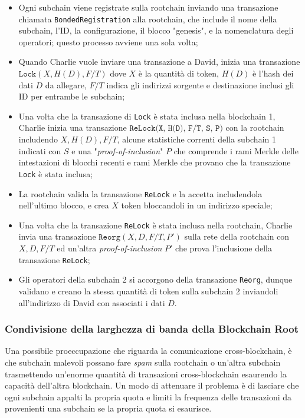 \begin{itemize}
	\item Ogni subchain viene registrate sulla rootchain inviando una transazione chiamata \texttt{BondedRegistration} alla rootchain, che include il nome della subchain, l'ID, la configurazione, il blocco "genesis", e la nomenclatura degli operatori; questo processo avviene una sola volta;

	\item Quando Charlie vuole inviare una transazione a David, inizia una transazione $\texttt{Lock}(X, H(D), F/T)$ dove $X$ è la quantità di token, $H(D)$ è l'hash dei dati $D$ da allegare, $F/T$ indica gli indirizzi sorgente e destinazione inclusi gli ID per entrambe le subchain;

	\item Una volta che la transazione di \texttt{Lock} è stata inclusa nella blockchain 1, Charlie inizia una transazione $\texttt{ReLock(X, H(D), F/T, S, P)}$ con la rootchain includendo $X, H(D), F/T$, alcune statistiche correnti della subchain 1 indicati con $S$ e una "\emph{proof-of-inclusion}" $P$ che comprende i rami Merkle delle intestazioni di blocchi recenti e rami Merkle che provano che la transazione \texttt{Lock} è stata inclusa;

	\item La rootchain valida la transazione \texttt{ReLock} e la accetta includendola nell'ultimo blocco, e crea $X$ token bloccandoli in un indirizzo speciale;

	\item Una volta che la transazione \texttt{ReLock} è stata inclusa nella rootchain, Charlie invia una transazione $\texttt{Reorg}(X, D, F/T, P')$ sulla rete della rootchain con $X, D, F/T$ ed un'altra \emph{proof-of-inclusion} $P'$ che prova l'inclusione della transazione \texttt{ReLock};

	\item Gli operatori della subchain 2 si accorgono della transazione \texttt{Reorg}, dunque validano e creano la stessa quantità di token sulla subchain 2 inviandoli all'indirizzo di David con associati i dati $D$.

\end{itemize}

\subsubsection{Condivisione della larghezza di banda della Blockchain Root}
Una possibile proeccupazione che riguarda la comunicazione cross-blockchain, è che subchain malevoli possano fare \emph{spam} sulla rootchain o un'altra subchain trasmettendo un'enorme quantità di transazioni cross-blockchain esaurendo la capacità dell'altra blockchain. Un modo di attenuare il problema è di lasciare che ogni subchain appalti la propria quota e limiti la frequenza delle transazioni da provenienti una subchain se la propria quota si esaurisce.

